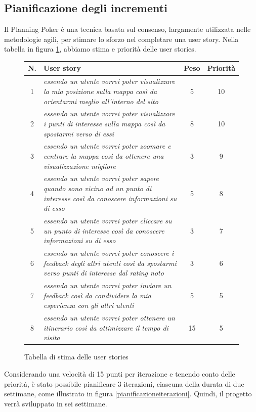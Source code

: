 \subsection{Pianificazione degli incrementi}
Il Planning Poker è una tecnica basata sul consenso, largamente utilizzata nelle metodologie agili, per stimare lo sforzo nel completare una user story.
Nella tabella in figura \ref{userstoriestable}, abbiamo stima e priorità delle user stories.

\begin{figure}[h]
\begin{center}
\begin{tabular}[c]{|c|p{10cm}|c|c|}
\hline
N. & User story & Peso & Priorità\\
\hline
1 & \textit{essendo un utente vorrei poter visualizzare la mia posizione sulla mappa così da orientarmi meglio all'interno del sito} & 5 & 10\\
\hline
2 & \textit{essendo un utente vorrei poter visualizzare i punti di interesse sulla mappa così da spostarmi verso di essi} & 8 & 10\\
\hline
3 & \textit{essendo un utente vorrei poter zoomare e centrare la mappa così da ottenere una visualizzazione migliore} & 3 & 9\\
\hline
4 & \textit{essendo un utente vorrei poter sapere quando sono vicino ad un punto di interesse così da conoscere informazioni su di esso} & 5 & 8\\
\hline
5 & \textit{essendo un utente vorrei poter cliccare su un punto di interesse così da conoscere informazioni su di esso} & 3 & 7\\
\hline
6 & \textit{essendo un utente vorrei poter conoscere i feedback degli altri utenti così da spostarmi verso punti di interesse dal rating noto} & 3 & 6\\
\hline
7 & \textit{essendo un utente vorrei poter inviare un feedback così da condividere la mia esperienza con gli altri utenti} & 5 & 5\\
\hline
8 & \textit{essendo un utente vorrei poter ottenere un itinerario così da ottimizzare il tempo di visita} & 15 & 5\\
\hline
\end{tabular}
\caption{Tabella di stima delle user stories\label{userstoriestable}}
\end{center}
\end{figure}
\clearpage


Considerando una velocità di 15 punti per iterazione e tenendo conto delle priorità, è stato possibile pianificare 3 iterazioni, ciascuna della durata di due settimane, come illustrato in figura \ref{pianificazioneiterazioni}.
Quindi, il progetto verrà sviluppato in sei settimane.

